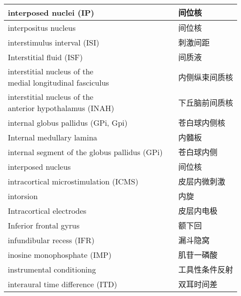 \begin{longtable}{lll}
	\midrule
	interposed nuclei (IP)  && 间位核  \\
	
	\midrule
	interpositus nucleus  && 间位核  \\
	
	\midrule
	interstimulus interval (ISI)  && 刺激间距  \\
	
	\midrule
	Interstitial fluid (ISF)  && 间质液  \\
	
	\midrule
	\makecell[l]{interstitial nucleus of the \\medial longitudinal fasciculus}   && 内侧纵束间质核  \\
	
	\midrule
	\makecell[l]{interstitial nucleus of the \\anterior hypothalamus  (INAH)} && 下丘脑前间质核  \\
	
	\midrule
	internal globus pallidus (GPi, Gpi)  && 苍白球内侧核  \\
	
	\midrule
	Internal medullary lamina  && 内髓板  \\
	
	\midrule
	internal segment of the globus pallidus (GPi) && 苍白球内侧  \\
	
	\midrule
	interposed nucleus && 间位核  \\
	
	\midrule
	intracortical microstimulation (ICMS)  && 皮层内微刺激  \\
	
	\midrule
	intorsion   && 内旋  \\
	
	\midrule
	Intracortical electrodes   && 皮层内电极  \\
	
	\midrule
	Inferior frontal gyrus   && 额下回  \\
	
	\midrule
	infundibular recess (IFR)   && 漏斗隐窝  \\
	
	\midrule
	inosine monophosphate (IMP)  && 肌苷一磷酸  \\
	
	\midrule
	instrumental conditioning  && 工具性条件反射  \\
	
	\midrule
	interaural time difference (ITD)   && 双耳时间差  \\
	

\end{longtable}
